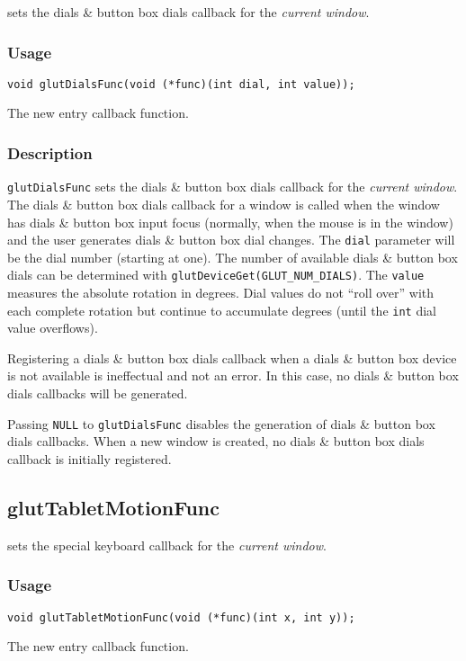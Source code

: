  sets the dials \& button box dials callback for
the {\em current window}.

\subsubsection*{Usage}
\begin{verbatim}
void glutDialsFunc(void (*func)(int dial, int value));
\end{verbatim}
\begin{description}
\itemsep 0in
\item[\tt func]
The new entry callback function.
\end{description}

\subsubsection*{Description}

{\tt glutDialsFunc} sets the dials \& button box dials callback for the {\em
current window}.  The dials \& button box dials callback for a window is called when the
window has dials \& button box input focus (normally, when the mouse is in the window)
and the user generates dials \& button box dial changes.  The {\tt dial} parameter
will be the dial number (starting at one).  The number of available dials \&
button box
dials can be determined with {\tt glutDeviceGet(GLUT\_NUM\_DIALS)}.
The {\tt value} measures the absolute rotation in degrees.
Dial values do not ``roll over'' with each complete rotation but
continue to accumulate degrees (until the {\tt int} dial value
overflows).

Registering a dials \& button box dials callback when a dials \& button box
device is not available
is ineffectual and not an error.  In this case, no dials \& button box dials callbacks
will be generated.

Passing {\tt NULL} to {\tt glutDialsFunc} disables the generation of
dials \& button box dials callbacks.  When a new window is created, no
dials \& button box dials callback is initially registered.

\subsection{glutTabletMotionFunc}

 sets the special keyboard callback for the {\em current window}.

\subsubsection*{Usage}
\begin{verbatim}
void glutTabletMotionFunc(void (*func)(int x, int y));
\end{verbatim}
\begin{description}
\itemsep 0in
\item[\tt func]
The new entry callback function.
\end{description}

